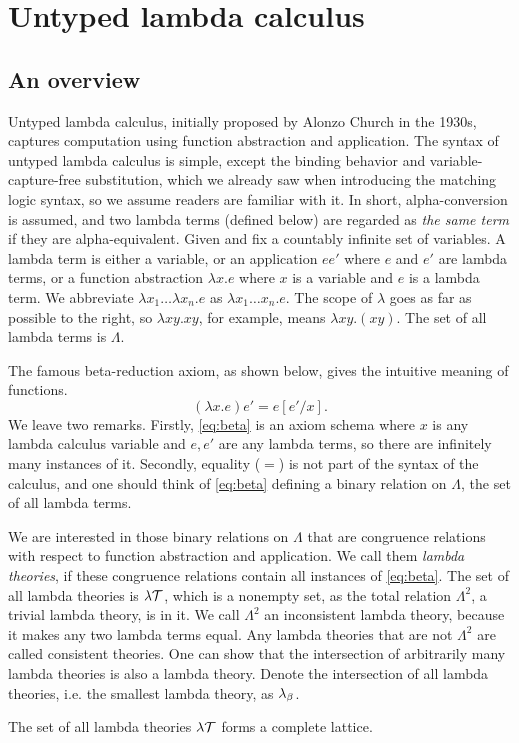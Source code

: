 \section{Untyped lambda calculus}

\subsection{An overview}

Untyped lambda calculus, initially proposed by Alonzo Church in the 1930s,
captures computation using function abstraction and application.
The syntax of untyped lambda calculus is simple,
except the binding behavior and variable-capture-free substitution,
which we already saw when introducing the matching logic syntax,
so we assume readers are familiar with it.
In short, alpha-conversion is assumed, and two lambda terms 
(defined below) are regarded as \emph{the same term} 
if they are alpha-equivalent.
Given and fix a countably infinite set of variables.
A lambda term is either a variable,
or an application $e e'$ where $e$ and $e'$ are lambda terms,
or a function abstraction $\lambda x . e$ 
where $x$ is a variable and $e$ is a lambda term.
We abbreviate $\lambda x_1 \dots \lambda x_n . e$ as
$\lambda x_1 \dots x_n . e$.
The scope of $\lambda$ goes as far as possible to the right,
so $\lambda x y . x y$, for example, means $\lambda x y . (x y)$.
The set of all lambda terms is $\Lambda$.

The famous beta-reduction axiom, as shown below,
gives the intuitive meaning of functions. 
\begin{equation}
\label{eq:beta}
\tag{$\beta$}
(\lambda x . e) e' = e[e'/x].
\end{equation}
We leave two remarks.
Firstly, \eqref{eq:beta} is an axiom schema
where $x$ is any lambda calculus variable
and $e, e'$ are any lambda terms,
so there are infinitely many instances of it.
Secondly, equality ($=$) is not part of the syntax of the calculus,
and one should think of \eqref{eq:beta}
defining a binary relation on $\Lambda$, the set of all lambda terms.

We are interested in those binary relations on $\Lambda$
that are congruence relations with respect to
function abstraction and application.
We call them \emph{lambda theories}, if these congruence relations
contain all instances of \eqref{eq:beta}.
The set of all lambda theories is $\lambda\mathcal{T}$,
which is a nonempty set, 
as the total relation $\Lambda^2$, a trivial lambda theory, is in it.
We call $\Lambda^2$
an inconsistent lambda theory, because it makes any two lambda terms equal.
Any lambda theories that are not $\Lambda^2$ are called consistent theories.
One can show that the intersection of arbitrarily many lambda theories
is also a lambda theory.
Denote the intersection of all lambda theories, i.e. the smallest lambda theory,
as $\lambda_\beta$.

The set of all lambda theories $\lambda\mathcal{T}$ forms a complete lattice.